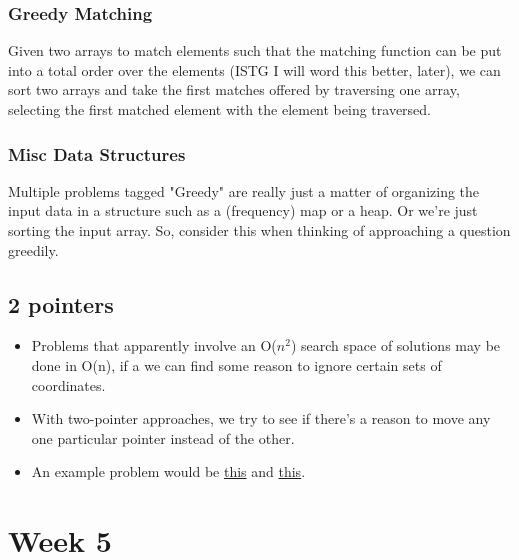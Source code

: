\documentclass{report}
\begin{document}
\subsection{Greedy Matching}
Given two arrays to match elements such that the matching function
can be put into a total order over the elements (ISTG I will word this better,
later), we can sort two arrays and take the first matches offered
by traversing one array, selecting the first matched element with
the element being traversed.
\subsection{Misc Data Structures}
Multiple problems tagged "Greedy" are really just a matter of
organizing the input data in a structure such as a (frequency)
map or a heap. Or we're just sorting the input array.
So, consider this when thinking of approaching 
a question greedily.
\section{2 pointers}
\begin{itemize}
\item Problems that apparently involve an O($n^2$) search space of solutions may be done in O(n), if a we can find some reason to ignore certain sets of coordinates.
\item With two-pointer approaches, we try to see if there's a reason to move any one particular pointer instead of the other.
\item An example problem would be \href{https://leetcode.com/problems/container-with-most-water/}{this} and \href{https://leetcode.com/problems/maximum-score-of-a-good-subarray/}{this}.
\end{itemize}
\chapter{Week 5}
\end{document}
